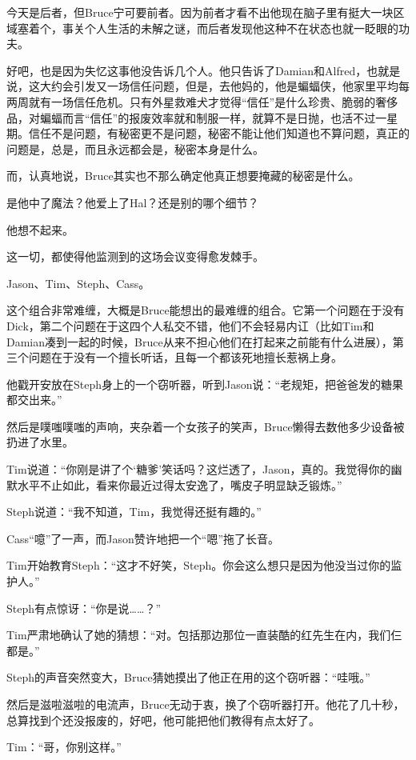 \documentclass[../main.tex]{subfiles}
\begin{document}
今天是后者，但Bruce宁可要前者。因为前者才看不出他现在脑子里有挺大一块区域塞着个，事关个人生活的未解之谜，而后者发现他这种不在状态也就一眨眼的功夫。

好吧，也是因为失忆这事他没告诉几个人。他只告诉了Damian和Alfred，也就是说，这大约会引发又一场信任问题，但是，去他妈的，他是蝙蝠侠，他家里平均每两周就有一场信任危机。只有外星救难犬才觉得“信任”是什么珍贵、脆弱的奢侈品，对蝙蝠而言“信任”的报废效率就和制服一样，就算不是日抛，也活不过一星期。信任不是问题，有秘密更不是问题，秘密不能让他们知道也不算问题，真正的问题是，总是，而且永远都会是，秘密本身是什么。

而，认真地说，Bruce其实也不那么确定他真正想要掩藏的秘密是什么。

是他中了魔法？他爱上了Hal？还是别的哪个细节？

他想不起来。

这一切，都使得他监测到的这场会议变得愈发棘手。

Jason、Tim、Steph、Cass。

这个组合非常难缠，大概是Bruce能想出的最难缠的组合。它第一个问题在于没有Dick，第二个问题在于这四个人私交不错，他们不会轻易内讧（比如Tim和Damian凑到一起的时候，Bruce从来不担心他们在打起来之前能有什么进展），第三个问题在于没有一个擅长听话，且每一个都该死地擅长惹祸上身。

他戳开安放在Steph身上的一个窃听器，听到Jason说：“老规矩，把爸爸发的糖果都交出来。”

然后是噗嗤噗嗤的声响，夹杂着一个女孩子的笑声，Bruce懒得去数他多少设备被扔进了水里。

Tim说道：“你刚是讲了个`糖爹'笑话吗？这烂透了，Jason，真的。我觉得你的幽默水平不止如此，看来你最近过得太安逸了，嘴皮子明显缺乏锻炼。”

Steph说道：“我不知道，Tim，我觉得还挺有趣的。”

Cass“噫”了一声，而Jason赞许地把一个“嗯”拖了长音。

Tim开始教育Steph：“这才不好笑，Steph。你会这么想只是因为他没当过你的监护人。”

Steph有点惊讶：“你是说\ldots\ldots？”

Tim严肃地确认了她的猜想：“对。包括那边那位一直装酷的红先生在内，我们仨都是。”

Steph的声音突然变大，Bruce猜她摸出了他正在用的这个窃听器：“哇哦。”

然后是滋啦滋啦的电流声，Bruce无动于衷，换了个窃听器打开。他花了几十秒，总算找到个还没报废的，好吧，他可能把他们教得有点太好了。

Tim：“哥，你别这样。”
\end{document}
